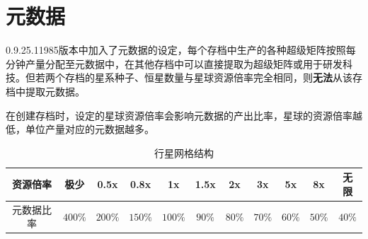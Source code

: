 \section{元数据}


0.9.25.11985版本中加入了元数据的设定，每个存档中生产的各种超级矩阵按照每分钟产量分配至元数据中，在其他存档中可以直接提取为超级矩阵或用于研发科技。但若两个存档的星系种子、恒星数量与星球资源倍率完全相同，则\textbf{无法}从该存档中提取元数据。

在创建存档时，设定的星球资源倍率会影响元数据的产出比率，星球的资源倍率越低，单位产量对应的元数据越多。

\begin{table}
    \footnotesize
    \centering
    \caption{行星网格结构}
    \label{tbl:metadata-ratio}
    \begin{tabular}{*{11}{c}}
        \toprule
        资源倍率 & 极少 & 0.5x & 0.8x & 1x & 1.5x & 2x & 3x & 5x & 8x & 无限 \\
        \midrule
        元数据比率 & $400\%$ & $200\%$ & $150\%$ & $100\%$ & $90\%$ & $80\%$ & $70\%$ & $60\%$ & $50\%$ & $40\%$ \\
        \bottomrule
    \end{tabular}
\end{table}